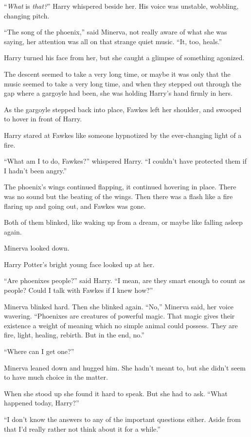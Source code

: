 ``\emph{What} is \emph{that?}'' Harry whispered beside her. His voice was unstable, wobbling, changing pitch.

``The song of the phoenix,'' said Minerva, not really aware of what she was saying, her attention was all on that strange quiet music. ``It, too, heals.''

Harry turned his face from her, but she caught a glimpse of something agonized.

The descent seemed to take a very long time, or maybe it was only that the music seemed to take a very long time, and when they stepped out through the gap where a gargoyle had been, she was holding Harry's hand firmly in hers.

As the gargoyle stepped back into place, Fawkes left her shoulder, and swooped to hover in front of Harry.

Harry stared at Fawkes like someone hypnotized by the ever-changing light of a fire.

``What am I to do, Fawkes?'' whispered Harry. ``I couldn't have protected them if I hadn't been angry.''

The phoenix's wings continued flapping, it continued hovering in place. There was no sound but the beating of the wings. Then there was a flash like a fire flaring up and going out, and Fawkes was gone.

Both of them blinked, like waking up from a dream, or maybe like falling asleep again.

Minerva looked down.

Harry Potter's bright young face looked up at her.

``Are phoenixes people?'' said Harry. ``I mean, are they smart enough to count as people? Could I talk with Fawkes if I knew how?''

Minerva blinked hard. Then she blinked again. ``No,'' Minerva said, her voice wavering. ``Phoenixes are creatures of powerful magic. That magic gives their existence a weight of meaning which no simple animal could possess. They are fire, light, healing, rebirth. But in the end, no.''

``Where can I get one?''

Minerva leaned down and hugged him. She hadn't meant to, but she didn't seem to have much choice in the matter.

When she stood up she found it hard to speak. But she had to ask. ``What happened today, Harry?''

``I don't know the answers to any of the important questions either. Aside from that I'd really rather not think about it for a while.''

